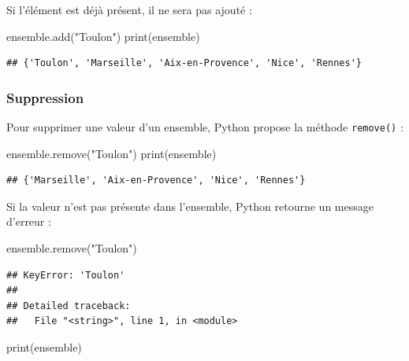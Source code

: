 \documentclass[12pt,]{book}
\newenvironment{Shaded}{\begin{snugshade}}{\end{snugshade}}
\newcommand{\StringTok}[1]{\textcolor[rgb]{0.31,0.60,0.02}{#1}}
\newcommand{\BuiltInTok}[1]{#1}
\newcommand{\NormalTok}[1]{#1}
\numberwithin{equation}{section}
\numberwithin{countremarque}{section}
\begin{document}
Si l'élément est déjà présent, il ne sera pas ajouté :

\begin{Shaded}
\begin{Highlighting}[]
\NormalTok{ensemble.add(}\StringTok{"Toulon"}\NormalTok{)}
\BuiltInTok{print}\NormalTok{(ensemble)}
\end{Highlighting}
\end{Shaded}

\begin{lstlisting}
## {'Toulon', 'Marseille', 'Aix-en-Provence', 'Nice', 'Rennes'}
\end{lstlisting}

\subsubsection{Suppression}\label{suppression}

Pour supprimer une valeur d'un ensemble, Python propose la méthode
\texttt{remove()} :

\begin{Shaded}
\begin{Highlighting}[]
\NormalTok{ensemble.remove(}\StringTok{"Toulon"}\NormalTok{)}
\BuiltInTok{print}\NormalTok{(ensemble)}
\end{Highlighting}
\end{Shaded}

\begin{lstlisting}
## {'Marseille', 'Aix-en-Provence', 'Nice', 'Rennes'}
\end{lstlisting}

Si la valeur n'est pas présente dans l'ensemble, Python retourne un
message d'erreur :

\begin{Shaded}
\begin{Highlighting}[]
\NormalTok{ensemble.remove(}\StringTok{"Toulon"}\NormalTok{)}
\end{Highlighting}
\end{Shaded}

\begin{lstlisting}
## KeyError: 'Toulon'
## 
## Detailed traceback: 
##   File "<string>", line 1, in <module>
\end{lstlisting}

\begin{Shaded}
\begin{Highlighting}[]
\BuiltInTok{print}\NormalTok{(ensemble)}
\end{Highlighting}
\end{Shaded}
\end{document}
